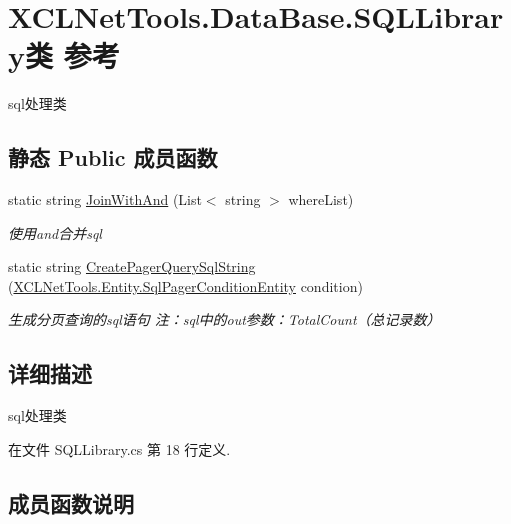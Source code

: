 \hypertarget{class_x_c_l_net_tools_1_1_data_base_1_1_s_q_l_library}{}\section{X\+C\+L\+Net\+Tools.\+Data\+Base.\+S\+Q\+L\+Library类 参考}
\label{class_x_c_l_net_tools_1_1_data_base_1_1_s_q_l_library}


sql处理类  


\subsection*{静态 Public 成员函数}
\begin{DoxyCompactItemize}
\item 
static string \hyperlink{class_x_c_l_net_tools_1_1_data_base_1_1_s_q_l_library_acc256989f11747ac9cc52cd138088f81}{Join\+With\+And} (List$<$ string $>$ where\+List)
\begin{DoxyCompactList}\small\item\em 使用\textquotesingle{}and\textquotesingle{}合并sql \end{DoxyCompactList}\item 
static string \hyperlink{class_x_c_l_net_tools_1_1_data_base_1_1_s_q_l_library_afe56acf93da2af8c2671f8bfda89253d}{Create\+Pager\+Query\+Sql\+String} (\hyperlink{class_x_c_l_net_tools_1_1_entity_1_1_sql_pager_condition_entity}{X\+C\+L\+Net\+Tools.\+Entity.\+Sql\+Pager\+Condition\+Entity} condition)
\begin{DoxyCompactList}\small\item\em 生成分页查询的sql语句 注：sql中的out参数：\+Total\+Count（总记录数） \end{DoxyCompactList}\end{DoxyCompactItemize}


\subsection{详细描述}
sql处理类 



在文件 S\+Q\+L\+Library.\+cs 第 18 行定义.



\subsection{成员函数说明}
\mbox{\label{class_x_c_l_net_tools_1_1_data_base_1_1_s_q_l_library_afe56acf93da2af8c2671f8bfda89253d}} 
